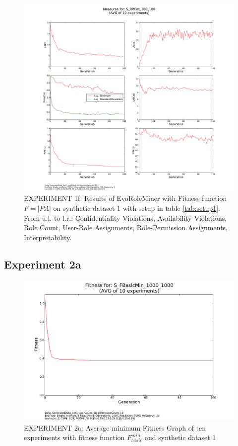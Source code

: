     \begin{figure}[H]
        \centering
        \includegraphics[scale=0.33, trim=4cm 2cm 4cm 0cm, clip=true]{./Figures/exp1rpCnt}
        \caption{EXPERIMENT 1f: Results of EvoRoleMiner with Fitness function $F=|PA|$ on synthetic dataset 1 with setup in table \ref{tab:setup1}. From u.l. to l.r.: Confidentiality Violations, Availability Violations, Role Count, User-Role Assignments, Role-Permission Assignments, Interpretability.}
        \label{fig:exp1rpCnt}
    \end{figure}

\subsection{Experiment 2a}
    \begin{figure}[H]
        \centering
        \includegraphics[scale=0.4, trim=0cm 2cm 0cm 0cm, clip=true]{./Figures/exp2aFitness}
        \caption{EXPERIMENT 2a: Average minimum Fitness Graph of ten experiments with fitness function $F_{basic}^{min}$ and synthetic dataset 1}
    \label{fig:exp2afitness}
    \end{figure}

